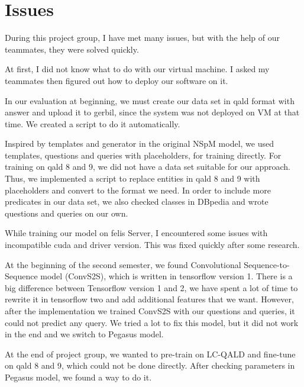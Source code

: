 
\section{Issues}

During this project group,
I have met many issues, 
but with the help of our teammates, 
they were solved quickly.

At first, I did not know what to do with our virtual machine. 
I asked my teammates then figured out how to deploy our software on it. 

In our evaluation at beginning, 
we must create our data set in qald format with answer
and upload it to gerbil,
since the system was not deployed on VM at that time. 
We created a script to do it automatically. 

Inspired by templates and generator in the original NSpM model,
we used templates, questions and queries with placeholders, for training directly.
For training on qald 8 and 9, 
we did not have a data set suitable for our approach. 
Thus, we implemented a script to replace entities in qald 8 and 9 with placeholders
and convert to the format we need. 
In order to include more predicates in our data set, 
we also checked classes in DBpedia 
and wrote questions and queries on our own. 

While training our model on felis Server, 
I encountered some issues with incompatible cuda and driver version. 
This was fixed quickly after some research. 

At the beginning of the second semester,
we found Convolutional Sequence-to-Sequence model (ConvS2S),
which is written in tensorflow version 1. 
There is a big difference between Tensorflow version 1 and 2,
we have spent a lot of time to rewrite it in tensorflow two
and add additional features that we want.
However, after the implementation we trained ConvS2S with our questions and queries,
it could not predict any query. 
We tried a lot to fix this model, 
but it did not work in the end
and we switch to Pegasus model. 

At the end of project group, 
we wanted to pre-train on LC-QALD and fine-tune on qald 8 and 9,
which could not be done directly. 
After checking parameters in Pegasus model, 
we found a way to do it. 